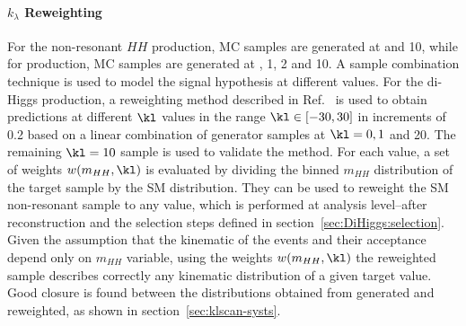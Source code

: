 \paragraph{$k_\lambda$ Reweighting}
For the \ggH non-resonant $HH$ production, MC samples are generated at  and 10, 
while for \VBFH production, 
MC samples are generated at , 1, 2 and 10. 
A sample combination technique is used to model the signal hypothesis at different \kl values.
For the \ggH di-Higgs production, 
a reweighting method described in Ref.~\cite{ATL-PHYS-PUB-2019-007} 
is used to obtain predictions at different $\kl$ values 
in the range $\kl \in \left[-30, 30 \right] $ 
in increments of 0.2 based on a linear combination of 
generator samples at $\kl=0, 1$ and 20. 
The remaining $\kl = 10$ sample is used to validate the method.
For each \kl value, a set of weights $w(m_{HH},\kl)$ is evaluated 
by dividing the binned $m_{HH}$ distribution of the \kl target sample 
by the SM distribution. 
They can be used to reweight the SM non-resonant sample to any \kl value,
which is performed at analysis level--after reconstruction and the selection steps
defined in section~\ref{sec:DiHiggs:selection}. 
Given the assumption that the kinematic of the \ggH events 
and their acceptance depend only on $m_{HH}$ variable, 
using the weights $w(m_{HH},\kl)$ the reweighted sample describes correctly any kinematic distribution of a given target \kl value. 
Good closure is found between the distributions obtained from \kl generated and reweighted, 
as shown in section~\ref{sec:klscan-systs}.

